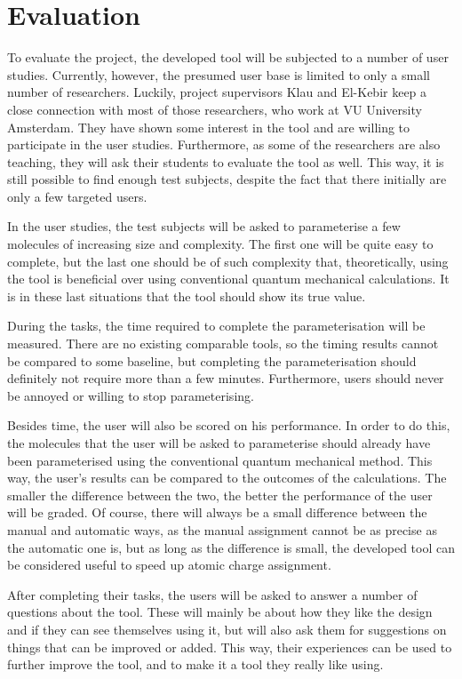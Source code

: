 \section{Evaluation}

To evaluate the project, the developed tool will be subjected to a number of user studies. Currently, however, the presumed user base is limited to only a small number of researchers. Luckily, project supervisors Klau and El-Kebir keep a close connection with most of those researchers, who work at VU University Amsterdam. They have shown some interest in the tool and are willing to participate in the user studies. Furthermore, as some of the researchers are also teaching, they will ask their students to evaluate the tool as well. This way, it is still possible to find enough test subjects, despite the fact that there  initially are only a few targeted users.

In the user studies, the test subjects will be asked to parameterise a few molecules of increasing size and complexity. The first one will be quite easy to complete, but the last one should be of such complexity that, theoretically, using the tool is beneficial over using conventional quantum mechanical calculations. It is in these last situations that the tool should show its true value.

During the tasks, the time required to complete the parameterisation will be measured. There are no existing comparable tools, so the timing results cannot be compared to some baseline, but completing the parameterisation should definitely not require more than a few minutes. Furthermore, users should never be annoyed or willing to stop parameterising.

Besides time, the user will also be scored on his performance. In order to do this, the molecules that the user will be asked to parameterise should already have been parameterised using the conventional quantum mechanical method. This way, the user's results can be compared to the outcomes of the calculations. The smaller the difference between the two, the better the performance of the user will be graded. Of course, there will always be a small difference between the manual and automatic ways, as the manual assignment cannot be as precise as the automatic one is, but as long as the difference is small, the developed tool can be considered useful to speed up atomic charge assignment.

After completing their tasks, the users will be asked to answer a number of questions about the tool. These will mainly be about how they like the design and if they can see themselves using it, but will also ask them for suggestions on things that can be improved or added. This way, their experiences can be used to further improve the tool, and to make it a tool they really like using.


